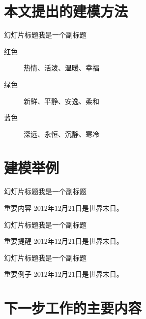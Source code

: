 \documentclass{beamer}
\begin{document}
\section{本文提出的建模方法}
\begin{frame}{幻灯片标题}{我是一个副标题}
\begin{description}
\item[红色] 热情、活泼、温暖、幸福
\item[绿色] 新鲜、平静、安逸、柔和
\item[蓝色] 深远、永恒、沉静、寒冷
\end{description}
\end{frame}
\section{建模举例}
\begin{frame}{幻灯片标题}{我是一个副标题}
\begin{block}{重要内容}
2012年12月21日是世界末日。
\end{block}
\end{frame}
\begin{frame}{幻灯片标题}{我是一个副标题}
\begin{alertblock}{重要提醒}
2012年12月21日是世界末日。
\end{alertblock}
\end{frame}
\begin{frame}{幻灯片标题}{我是一个副标题}
\begin{exampleblock}{重要例子}
2012年12月21日是世界末日。
\end{exampleblock}
\end{frame}

\section{下一步工作的主要内容}
\end{document}
